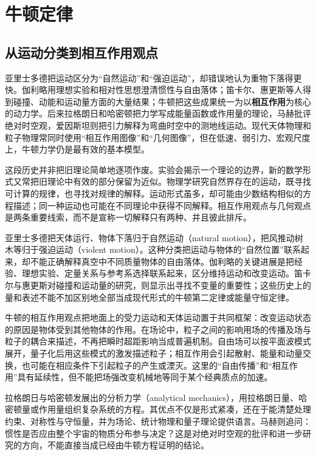 \section{牛顿定律}
\label{r2ch02:sec:newton}

\subsection{从运动分类到相互作用观点}
\label{r2ch02:sec:history}

亚里士多德把运动区分为“自然运动”和“强迫运动”，却错误地认为重物下落得更快。伽利略用理想实验和相对性思想澄清惯性与自由落体；笛卡尔、惠更斯等人得到碰撞、动能和运动量方面的大量结果；牛顿把这些成果统一为以\textbf{相互作用}为核心的动力学。后来拉格朗日和哈密顿把力学写成能量函数或作用量的理论，马赫批评绝对时空观，爱因斯坦则把引力解释为弯曲时空中的测地线运动。现代天体物理和粒子物理常同时使用“相互作用图像”和“几何图像”，但在低速、弱引力、宏观尺度上，牛顿力学仍是最有效的基本模型。

这段历史并非把旧理论简单地逐项作废。实验会揭示一个理论的边界，新的数学形式又常把旧理论中有效的部分保留为近似。物理学研究自然界存在的运动，既寻找可计算的规律，也寻找对规律的解释。运动形式虽多，却可能由少数结构相似的方程描述；同一种运动也可能在不同理论中获得不同解释。相互作用观点与几何观点是两条重要线索，而不是宣称一切解释只有两种、并且彼此排斥。

亚里士多德把天体运行、物体下落归于自然运动（natural motion），把风推动树木等归于强迫运动（violent motion）。这种分类把运动与物体的“自然位置”联系起来，却不能正确解释真空中不同质量物体的自由落体。伽利略的关键进展是把经验、理想实验、定量关系与参考系选择联系起来，区分维持运动和改变运动。笛卡尔与惠更斯对碰撞和运动量的研究，则显示出寻找不变量的重要性；这些历史上的量和表述不能不加区别地全部当成现代形式的牛顿第二定律或能量守恒定律。

牛顿的相互作用观点把地面上的受力运动和天体运动置于共同框架：改变运动状态的原因是物体受到其他物体的作用。在场论中，粒子之间的影响用场的传播及场与粒子的耦合来描述，不再把瞬时超距影响当成普遍机制。自由场可以按平面波模式展开，量子化后用这些模式的激发描述粒子；相互作用会引起散射、能量和动量交换，也可能在相应条件下引起粒子的产生或湮灭。这里的“自由传播”和“相互作用”具有延续性，但不能把场强改变机械地等同于某个经典质点的加速。

拉格朗日与哈密顿发展出的分析力学（analytical mechanics），用拉格朗日量、哈密顿量或作用量组织复杂系统的方程。其优点不仅是形式紧凑，还在于能清楚处理约束、对称性与守恒量，并为场论、统计物理和量子理论提供语言。马赫则追问：惯性是否应由整个宇宙的物质分布参与决定？这是对绝对时空观的批评和进一步研究的方向，不能直接当成已经由牛顿方程证明的结论。

